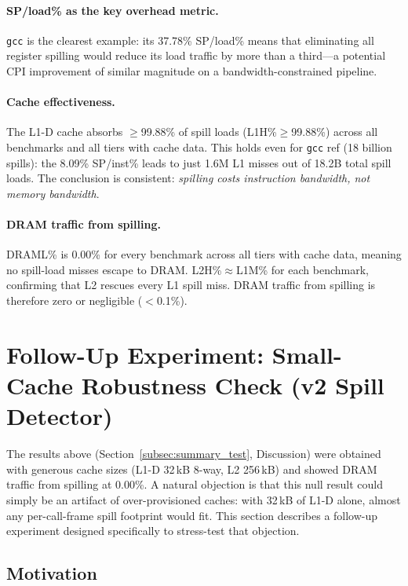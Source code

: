 \documentclass[11pt,a4paper]{article}
\begin{document}
\paragraph{SP/load\% as the key overhead metric.}
\texttt{gcc} is the clearest example: its 37.78\% SP/load\% means
that eliminating all register spilling would reduce its load traffic
by more than a third---a potential CPI improvement of similar
magnitude on a bandwidth-constrained pipeline.

\paragraph{Cache effectiveness.}
The L1-D cache absorbs $\geq$99.88\% of spill loads (L1H\%$\geq$99.88\%)
across all benchmarks and all tiers with cache data.  This holds even for
\texttt{gcc} ref (18 billion spills): the 8.09\% SP/inst\% leads to
just 1.6M L1 misses out of 18.2B total spill loads.
The conclusion is consistent: \emph{spilling costs instruction
bandwidth, not memory bandwidth}.

\paragraph{DRAM traffic from spilling.}
DRAML\% is 0.00\% for every benchmark across all tiers with cache data,
meaning no spill-load misses escape to DRAM.  L2H\%$\approx$L1M\%
for each benchmark, confirming that L2 rescues every L1 spill miss.
DRAM traffic from spilling is therefore zero or negligible ($<$0.1\%).

\section{Follow-Up Experiment: Small-Cache Robustness Check (\lowercase{v2} Spill Detector)}
\label{sec:smallcache}

The results above (Section~\ref{subsec:summary_test}, Discussion) were
obtained with generous cache sizes (L1-D 32\,kB 8-way, L2 256\,kB) and
showed DRAM traffic from spilling at 0.00\%.  A natural objection is
that this null result could simply be an artifact of over-provisioned
caches: with 32\,kB of L1-D alone, almost any per-call-frame spill
footprint would fit.  This section describes a follow-up experiment
designed specifically to stress-test that objection.

\subsection{Motivation}
\end{document}
